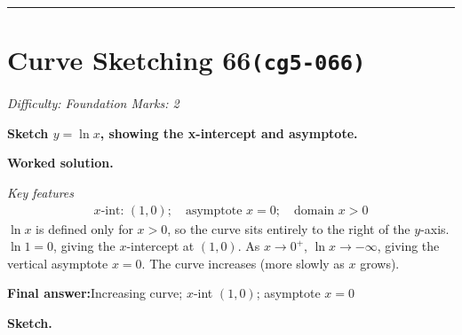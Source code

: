 \documentclass[11pt]{article}
\newcommand{\question}[1]{\par\medskip\noindent\textbf{#1}\par}
\begin{document}
\medskip\hrule

\section*{Curve Sketching 66\quad\small\texttt{(cg5-066)}}
\textit{Difficulty: Foundation \quad\textbar\quad Marks: 2}

\question{Sketch \( y = \ln x \), showing the x-intercept and asymptote.}

\textbf{Worked solution.}

\textit{Key features}
\[\begin{gathered}
x\text{-int: } (1, 0); \quad \text{asymptote } x = 0; \quad \text{domain } x > 0
\end{gathered}\]
\( \ln x \) is defined only for \( x > 0 \), so the curve sits entirely to the right of the \( y \)-axis. \( \ln 1 = 0 \), giving the \( x \)-intercept at \( (1, 0) \). As \( x \to 0^+ \), \( \ln x \to -\infty \), giving the vertical asymptote \( x = 0 \). The curve increases (more slowly as \( x \) grows).

\begin{answerbox}
\textbf{Final answer:}\quad Increasing curve; \(\displaystyle x\)-int \(\displaystyle (1,0)\); asymptote \(\displaystyle x = 0\)
\end{answerbox}
\textbf{Sketch.}
\end{document}
